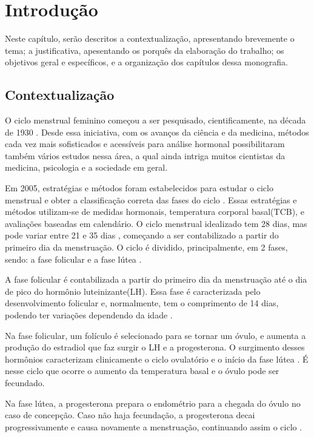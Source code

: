 \chapter[Introdução]{Introdução}
\label{ch:intro}

Neste capítulo, serão descritos a contextualização, apresentando brevemente o tema; a justificativa, 
apesentando os porquês da elaboração do trabalho; os objetivos geral e específicos, e a organização dos 
capítulos dessa monografia.

\section{Contextualização}

O ciclo menstrual feminino começou a ser pesquisado, cientificamente, na década de 1930 \cite{frank1931}.
Desde essa iniciativa, com os avanços da ciência e da medicina, métodos cada vez mais sofisticados e 
acessíveis para análise hormonal possibilitaram também vários estudos nessa área, a qual ainda intriga 
muitos cientistas da medicina, psicologia e a sociedade em geral.


Em 2005, estratégias e métodos foram estabelecidos para estudar o ciclo menstrual e obter a 
classificação correta das fases do ciclo \cite{becker2005}.
Essas estratégias e métodos utilizam-se de medidas hormonais, temperatura corporal basal(TCB), e 
avaliações baseadas em calendário. O ciclo menstrual idealizado tem 28 dias, mas pode variar entre 21 
e 35 dias \cite{lenton1984a}, começando a ser contabilizado a partir do primeiro dia da menstruação. 
O ciclo é dividido, principalmente, em 2 fases, sendo: a fase folicular e a fase lútea 
\cite{brondin2008}.


A fase folicular é contabilizada a partir do primeiro dia da menstruação até o dia de pico do hormônio 
luteinizante(LH). Essa fase é caracterizada pelo desenvolvimento folicular e, normalmente, tem o 
comprimento de 14 
dias, podendo ter variações dependendo da idade \cite{lenton1984a}.

Na fase folicular, um folículo é selecionado para se tornar um óvulo, e aumenta a produção do estradiol
que faz surgir o LH e a progesterona. O surgimento desses hormônios caracterizam clinicamente o ciclo 
ovulatório e o início da fase lútea \cite{fritz2010}. É nesse ciclo que ocorre o aumento da temperatura
basal e o óvulo pode ser fecundado. 


Na fase lútea, a progesterona prepara o endométrio para a chegada do óvulo no caso de concepção. 
Caso não haja fecundação, a progesterona decai progressivamente e causa novamente a menstruação, 
continuando assim o ciclo \cite{nikas2003}.


